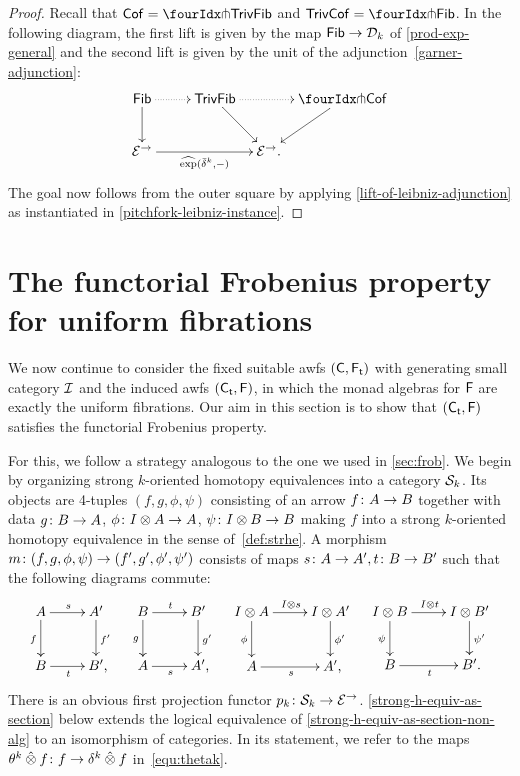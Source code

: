 \documentclass[reqno,10pt,a4paper,oneside,draft]{amsart}
\begin{document}
{{\begin{proof}
Recall that $\Cof = \liftl{\TrivFib}$ and $\TrivCof = \liftl{\Fib}$.
In the following diagram, the first lift is given by the map $\Fib \to \cal{D}_k$ of \cref{prod-exp-general} and the second lift is given by the unit of the adjunction~\eqref{garner-adjunction}:
\[
\xymatrix@C-1.5em{
  \Fib
  \ar@{.>}[rr]
  \ar[d]
&&
  \TrivFib
  \ar@{.>}[rr]
  \ar[dr]
&&
  \liftr{\Cof}
  \ar[dl]
\\
  \cal{E}^\to
  \ar[rrr]_-{\hatexp(\bar{\delta}^k, -)}
&&&
  \cal{E}^\to
\rlap{.}}
\]
The goal now follows from the outer square by applying \cref{lift-of-leibniz-adjunction} as instantiated in \cref{pitchfork-leibniz-instance}.
\end{proof}

\section{The functorial Frobenius property for uniform fibrations}
\label{sec:alg-frob}

We now continue to consider the fixed suitable awfs $(\CC, \TF)$ with generating small category $\cal{I}$ and the induced awfs $(\TC, \FF)$, in which the monad algebras for $\FF$ are exactly the uniform fibrations.
Our aim in this section is to show that $(\TC, \FF)$ satisfies the functorial Frobenius property.

For this, we follow a strategy analogous to the one we used in \cref{sec:frob}.
We begin by organizing strong $k$-oriented homotopy equivalences into a category $\cal{S}_k$.
Its objects are 4-tuples $(f, g, \phi, \psi)$ consisting of an arrow $f \co A \to B$ together with data $g \co B \to A$, $\phi \co \interval \otimes A \to A$, $\psi \co \interval \otimes B \to B$ making $f$ into a strong $k$-oriented homotopy equivalence in the sense of~\cref{def:strhe}.
A morphism $m \co (f, g, \phi, \psi) \to (f', g', \phi', \psi')$ consists of maps $s \co A \to A', t \co B \to B'$ such that the following diagrams commute:
\begin{align*}
\xymatrix{
  A
  \ar[r]^{s}
  \ar[d]_{f}
&
  A'
  \ar[d]^{f'}
\\
  B
  \ar[r]_{t}
&
  B'
\rlap{,}}
&&
\xymatrix{
  B
  \ar[r]^{t}
  \ar[d]_{g}
&
  B'
  \ar[d]^{g'}
\\
  A
  \ar[r]_{s}
&
  A'
\rlap{,}}
&&
\xymatrix{
  \interval \otimes A
  \ar[d]_{\phi}
  \ar[r]^{\interval \otimes s}
&
  I \otimes A'
  \ar[d]^{\phi'}
\\
  A
  \ar[r]_{s}
&
  A'
\rlap{,}}
&&
\xymatrix{
  \interval \otimes B
  \ar[d]_{\psi}
  \ar[r]^{\interval \otimes t}
&
  I \otimes B'
  \ar[d]^{\psi'}
\\
  B
  \ar[r]_{t}
&
  B'
\rlap{.}}
\end{align*}
There is an obvious first projection functor $p_k \co \cal{S}_k \to \catE^\to$.
\cref{strong-h-equiv-as-section} below extends the logical equivalence of \cref{strong-h-equiv-as-section-non-alg} to an isomorphism of categories.
In its statement, we refer to the maps~$\thetak \hatotimes f \co f \to \kcyl \hatotimes f$ in~\eqref{equ:thetak}.

}}
\end{document}
